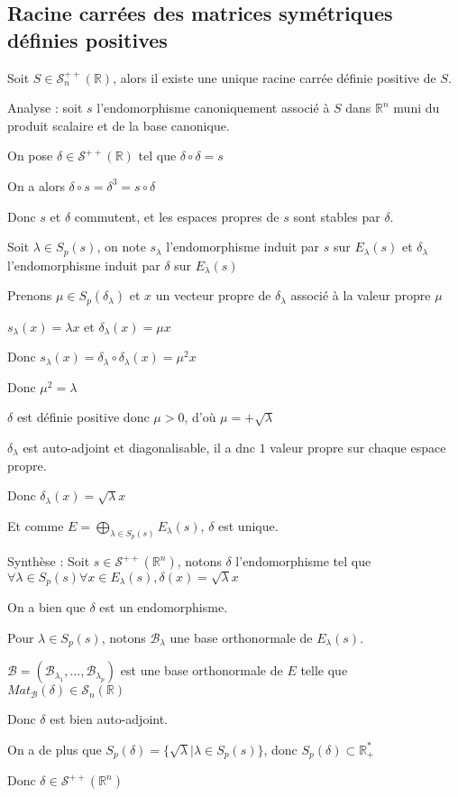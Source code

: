 \documentclass[a4paper,12pt]{book}
\newcommand{\Thr}[2]{\begin{tcolorbox}[sharp corners, colback=white,colframe=red!90!black!75, title=Théorème : #1]#2\end{tcolorbox}}
\newcommand{\Pre}[1]{\begin{tcolorbox}[sharp corners, colback=white,colframe=green!60!green!30!black!75, title=Preuve]#1\end{tcolorbox}}
\def\R{\mathbb{R}}
\begin{document}
\subsection{Racine carrées des matrices symétriques définies positives}
\Thr{}{Soit $S\in\mathcal{S}_n^{++}(\R)$, alors il existe une unique racine carrée définie positive de $S$.}
\Pre{Analyse : soit $s$ l'endomorphisme canoniquement associé à $S$ dans $\R^n$ muni du produit scalaire et de la base canonique.
\par On pose $\delta\in\mathcal{S}^{++}(\R)$ tel que $\delta\circ\delta=s$
\par On a alors $\delta\circ s = \delta^3=s\circ\delta$
\par Donc $s$ et $\delta$ commutent, et les espaces propres de $s$ sont stables par $\delta$.
\par Soit $\lambda\in S_p(s)$, on note $s_\lambda$ l'endomorphisme induit par $s$ sur $E_\lambda(s)$ et $\delta_\lambda$ l'endomorphisme induit par $\delta$ sur $E_\lambda(s)$
\par Prenons $\mu\in S_p(\delta_\lambda)$ et $x$ un vecteur propre de $\delta_\lambda$ associé à la valeur propre $\mu$
\par $s_\lambda(x) = \lambda x$ et $\delta_\lambda(x) = \mu x$
\par Donc $s_\lambda(x)=\delta_\lambda\circ\delta_\lambda(x) = \mu^2x$
\par Donc $\mu^2 = \lambda$
\par $\delta$ est définie positive donc $\mu>0$, d'où $\mu = +\sqrt{\lambda}$
\par $\delta_\lambda$ est auto-adjoint et diagonalisable, il a dnc $1$ valeur propre sur chaque espace propre.
\par Donc $\delta_\lambda (x) =\sqrt{\lambda}x$
\par Et comme $E = \bigoplus_{\lambda\in S_p(s)}E_\lambda(s)$, $\delta$ est unique.
\par Synthèse : Soit $s\in\mathcal{S}^{++}(\R^n)$, notons $\delta$ l'endomorphisme tel que $\forall\lambda\in S_p(s)\forall x\in E_\lambda(s), \delta(x)=\sqrt{\lambda}x$
\par On a bien que $\delta$ est un endomorphisme.
\par Pour $\lambda\in S_p(s)$, notons $\mathcal{B}_\lambda$ une base orthonormale de $E_\lambda(s)$.
\par $\mathcal{B}=(\mathcal{B}_{\lambda_1},...,\mathcal{B}_{\lambda_p})$ est une base orthonormale de $E$ telle que $Mat_\mathcal{B}(\delta)\in\mathcal{S}_n(\R)$
\par Donc $\delta$ est bien auto-adjoint.
\par On a de plus que $S_p(\delta) =\{\sqrt{\lambda}\vert \lambda\in S_p(s)\}$, donc $S_p(\delta)\subset\R_+^*$
\par Donc $\delta\in\mathcal{S}^{++}(\R^n)$}
\end{document}
